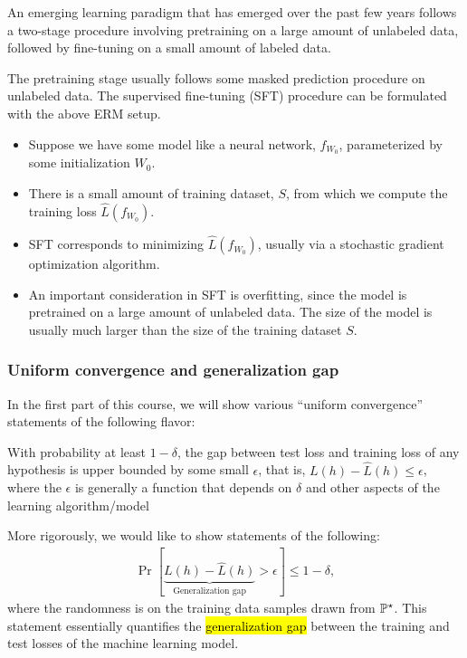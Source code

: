 \begin{example}
    An emerging learning paradigm that has emerged over the past few years follows a two-stage procedure involving pretraining on a large amount of unlabeled data, followed by fine-tuning on a small amount of labeled data.

    The pretraining stage usually follows some masked prediction procedure on unlabeled data.
    The supervised fine-tuning (SFT) procedure can be formulated with the above ERM setup.
    \begin{itemize}
        \item Suppose we have some model like a neural network, $f_{W_0}$, parameterized by some initialization $W_0$.

        \item There is a small amount of training dataset, $S$, from which we compute the training loss $\hat L(f_{W_0})$.

        \item SFT corresponds to minimizing $\hat L(f_{W_0})$, usually via a stochastic gradient optimization algorithm.

        \item An important consideration in SFT is overfitting, since the model is pretrained on a large amount of unlabeled data. The size of the model is usually much larger than the size of the training dataset $S$.
     \end{itemize}
\end{example}

\subsubsection{Uniform convergence and generalization gap}

In the first part of this course, we will show various ``uniform convergence'' statements of the following flavor:

\begin{mdframed}[
    roundcorner=10pt,
    leftmargin=0.1\textwidth,
    rightmargin=0.1\textwidth]
    With probability at least $1-\delta$, the gap between test loss and training loss of any hypothesis is upper bounded by some small $\epsilon$, that is, $L(h) - \hat L(h) \le \epsilon$, where the $\epsilon$ is generally a function that depends on $\delta$ and other aspects of the learning algorithm/model
\end{mdframed}

More rigorously, we would like to show statements of the following:
\begin{align}
    \Pr\left[\underbrace{L(h) - \hat L(h)}_{\text{Generalization gap}} > \epsilon\right] \le 1 - \delta,
\end{align}
where the randomness is on the training data samples drawn from $\mathbb{P}^{\star}$.
This statement essentially quantifies the \hl{generalization gap} between the training and test losses of the machine learning model.

